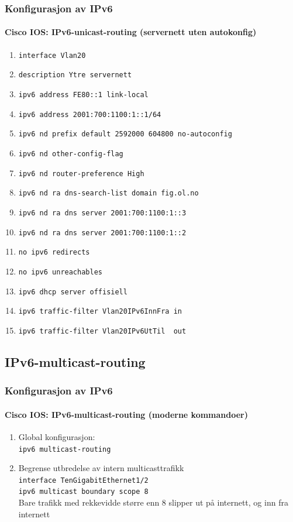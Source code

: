 \begin{frame}
  \frametitle{Konfigurasjon av IPv6}
  \framesubtitle{Cisco IOS: IPv6-unicast-routing (servernett uten autokonfig)}
  \begin{enumerate}
  \item \alert{\texttt{interface Vlan20}}
  \item \texttt{description Ytre servernett}
  \item \texttt{ipv6 address FE80::1 link-local}
  \item \texttt{ipv6 address 2001:700:1100:1::1/64}
  \item \alert{\texttt{ipv6 nd prefix default 2592000 604800 no-autoconfig}}
  \item \texttt{ipv6 nd other-config-flag}
  \item \texttt{ipv6 nd router-preference High}
  \item \texttt{ipv6 nd ra dns-search-list domain fig.ol.no}
  \item \texttt{ipv6 nd ra dns server 2001:700:1100:1::3}
  \item \texttt{ipv6 nd ra dns server 2001:700:1100:1::2}
  \item \texttt{no ipv6 redirects}
  \item \texttt{no ipv6 unreachables}
  \item \texttt{ipv6 dhcp server offisiell}
  \item \texttt{ipv6 traffic-filter Vlan20IPv6InnFra in}
  \item \texttt{ipv6 traffic-filter Vlan20IPv6UtTil\ \ out}
  \end{enumerate}
\end{frame}

\subsection{IPv6-multicast-routing}
\begin{frame}
  \frametitle{Konfigurasjon av IPv6}
  \framesubtitle{Cisco IOS: IPv6-multicast-routing (moderne kommandoer)}
  \begin{enumerate}
  \item Global konfigurasjon:\\
    \alert{\texttt{ipv6 multicast-routing}}\\
  \item Begrense utbredelse av intern multicasttrafikk\\
    \alert{\texttt{interface TenGigabitEthernet1/2}}\\
    \alert{\texttt{ipv6 multicast boundary scope 8}}\\
    Bare trafikk med rekkevidde større enn 8 slipper ut på internett,
    og inn fra internett
  \end{enumerate}
\end{frame}

